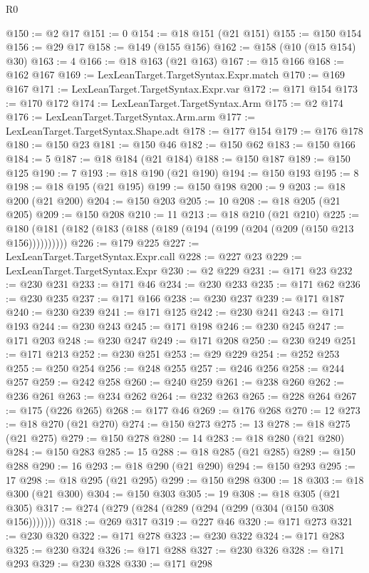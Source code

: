 \begin{lexlean}{R0}
\begin{coremodule}
@150 := @2 @17
@151 := 0
@154 := @18 @151 (@21 @151)
@155 := @150 @154
@156 := @29 @17
@158 := @149 (@155 @156)
@162 := @158 (@10 (@15 @154) @30)
@163 := 4
@166 := @18 @163 (@21 @163)
@167 := @15 @166
@168 := @162 @167
@169 := LexLeanTarget.TargetSyntax.Expr.match
@170 := @169 @167
@171 := LexLeanTarget.TargetSyntax.Expr.var
@172 := @171 @154
@173 := @170 @172
@174 := LexLeanTarget.TargetSyntax.Arm
@175 := @2 @174
@176 := LexLeanTarget.TargetSyntax.Arm.arm
@177 := LexLeanTarget.TargetSyntax.Shape.adt
@178 := @177 @154
@179 := @176 @178
@180 := @150 @23
@181 := @150 @46
@182 := @150 @62
@183 := @150 @166
@184 := 5
@187 := @18 @184 (@21 @184)
@188 := @150 @187
@189 := @150 @125
@190 := 7
@193 := @18 @190 (@21 @190)
@194 := @150 @193
@195 := 8
@198 := @18 @195 (@21 @195)
@199 := @150 @198
@200 := 9
@203 := @18 @200 (@21 @200)
@204 := @150 @203
@205 := 10
@208 := @18 @205 (@21 @205)
@209 := @150 @208
@210 := 11
@213 := @18 @210 (@21 @210)
@225 := @180 (@181 (@182 (@183 (@188 (@189 (@194 (@199 (@204 (@209 (@150 @213 @156))))))))))
@226 := @179 @225
@227 := LexLeanTarget.TargetSyntax.Expr.call
@228 := @227 @23
@229 := LexLeanTarget.TargetSyntax.Expr
@230 := @2 @229
@231 := @171 @23
@232 := @230 @231
@233 := @171 @46
@234 := @230 @233
@235 := @171 @62
@236 := @230 @235
@237 := @171 @166
@238 := @230 @237
@239 := @171 @187
@240 := @230 @239
@241 := @171 @125
@242 := @230 @241
@243 := @171 @193
@244 := @230 @243
@245 := @171 @198
@246 := @230 @245
@247 := @171 @203
@248 := @230 @247
@249 := @171 @208
@250 := @230 @249
@251 := @171 @213
@252 := @230 @251
@253 := @29 @229
@254 := @252 @253
@255 := @250 @254
@256 := @248 @255
@257 := @246 @256
@258 := @244 @257
@259 := @242 @258
@260 := @240 @259
@261 := @238 @260
@262 := @236 @261
@263 := @234 @262
@264 := @232 @263
@265 := @228 @264
@267 := @175 (@226 @265)
@268 := @177 @46
@269 := @176 @268
@270 := 12
@273 := @18 @270 (@21 @270)
@274 := @150 @273
@275 := 13
@278 := @18 @275 (@21 @275)
@279 := @150 @278
@280 := 14
@283 := @18 @280 (@21 @280)
@284 := @150 @283
@285 := 15
@288 := @18 @285 (@21 @285)
@289 := @150 @288
@290 := 16
@293 := @18 @290 (@21 @290)
@294 := @150 @293
@295 := 17
@298 := @18 @295 (@21 @295)
@299 := @150 @298
@300 := 18
@303 := @18 @300 (@21 @300)
@304 := @150 @303
@305 := 19
@308 := @18 @305 (@21 @305)
@317 := @274 (@279 (@284 (@289 (@294 (@299 (@304 (@150 @308 @156)))))))
@318 := @269 @317
@319 := @227 @46
@320 := @171 @273
@321 := @230 @320
@322 := @171 @278
@323 := @230 @322
@324 := @171 @283
@325 := @230 @324
@326 := @171 @288
@327 := @230 @326
@328 := @171 @293
@329 := @230 @328
@330 := @171 @298

\end{coremodule}
\end{lexlean}
